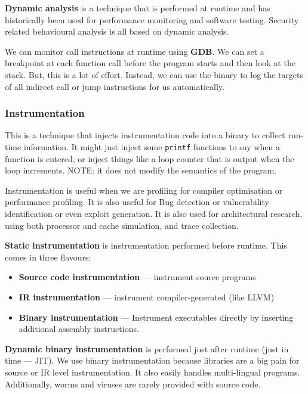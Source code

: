 \documentclass[11pt,a4paper,titlepage,dvipsnames,cmyk]{scrartcl}
\begin{document}
\textbf{Dynamic analysis} is a technique that is performed at runtime and has historically been used for performance monitoring and software testing. Security related behavioural analysis is all based on dynamic analysis.

We can monitor call instructions at runtime using \textbf{GDB}. We can set a breakpoint at each function call before the program starts and then look at the stack. But, this is a lot of effort. Instead, we can use the binary to log the targets of all indirect call or jump instructions for us automatically.

\subsubsection{Instrumentation}
This is a technique that injects instrumentation code into a binary to collect run-time information. It might just inject some \texttt{printf} functions to say when a function is entered, or inject things like a loop counter that is output when the loop increments. NOTE: it does not modify the semantics of the program.

Instrumentation is useful when we are profiling for compiler optimisation or performance profiling. It is also useful for Bug detection or vulnerability identification or even exploit generation. It is also used for architectural research, using both processor and cache simulation, and trace collection.

\textbf{Static instrumentation} is instrumentation performed before runtime. This comes in three flavours:
\begin{itemize}
    \item \textbf{Source code instrumentation} --- instrument source programs
    \item \textbf{IR instrumentation} --- instrument compiler-generated (like LLVM)
    \item \textbf{Binary instrumentation} --- Instrument executables directly by inserting additional assembly instructions.
\end{itemize}

\textbf{Dynamic binary instrumentation} is performed just after runtime (just in time --- JIT). We use binary instrumentation because libraries are a big pain for source or IR level instrumentation. It also easily handles multi-lingual programs. Additionally, worms and viruses are rarely provided with source code.
\end{document}
